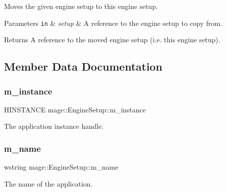 Moves the given engine setup to this engine setup.


\begin{DoxyParams}[1]{Parameters}
\mbox{\tt in}  & {\em setup} & A reference to the engine setup to copy from. \\
\hline
\end{DoxyParams}
\begin{DoxyReturn}{Returns}
A reference to the moved engine setup (i.\+e. this engine setup). 
\end{DoxyReturn}


\subsection{Member Data Documentation}
\hypertarget{classmage_1_1_engine_setup_a13e9577c9762cccf127b51c1188d9477}{}\label{classmage_1_1_engine_setup_a13e9577c9762cccf127b51c1188d9477} 
\subsubsection{\texorpdfstring{m\+\_\+instance}{m\_instance}}
{\footnotesize\ttfamily H\+I\+N\+S\+T\+A\+N\+CE mage\+::\+Engine\+Setup\+::m\+\_\+instance\hspace{0.3cm}{\ttfamily [private]}}

The application instance handle. \hypertarget{classmage_1_1_engine_setup_a3866920e44c0752a89265f9f0c5c5d05}{}\label{classmage_1_1_engine_setup_a3866920e44c0752a89265f9f0c5c5d05} 
\subsubsection{\texorpdfstring{m\+\_\+name}{m\_name}}
{\footnotesize\ttfamily wstring mage\+::\+Engine\+Setup\+::m\+\_\+name\hspace{0.3cm}{\ttfamily [private]}}

The name of the application. 